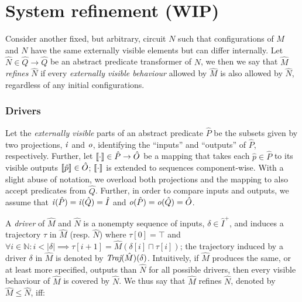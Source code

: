 \section{System refinement (WIP)}

Consider another fixed, but arbitrary, circuit $N$ such that configurations of $M$ and $N$ have the same externally visible elements but can differ internally. Let $\hat N \in \hat Q \rightarrow \hat Q$ be an abstract predicate transformer of $N$, we then we say that $\hat M$ \textit{refines} $\hat N$ if every \textit{externally visible behaviour} allowed by $\hat M$ is also allowed by $\hat N$, regardless of any initial configurations.


\subsubsection{Drivers} Let the \textit{externally visible} parts of an abstract predicate $\hat P$ be the subsets given by two projections, $\mathit{i}$ and $\mathit{o}$, identifying the ``inputs'' and ``outputs'' of $\hat P$, respectively. Further, let $\llbracket\cdot\rrbracket \in \hat P \rightarrow \hat O$ be a mapping that takes each $\hat p \in \hat P$ to its visible outputs $\llbracket\hat p\rrbracket \in \hat O$; $\llbracket\cdot\rrbracket$ is extended to sequences component-wise. With a slight abuse of notation, we overload both projections and the mapping to also accept predicates from $\hat Q$. Further, in order to compare inputs and outputs, we assume that $\mathit{i}(\hat P) = \mathit{i}(\hat Q) = \hat I$ and $\mathit{o}(\hat P) = \mathit{o}(\hat Q) = \hat O$.

A \textit{driver} of $\hat M$ and $\hat N$ is a nonempty sequence of inputs, $\delta \in \hat I^{+}$, and induces a trajectory $\tau$ in $\hat M$ (resp. $\hat N$) where $\tau[0] = \top$ and $\forall i \in \mathbb{N} : i < | \delta | \implies \tau[i+1] = \hat M(\delta[i] \sqcap \tau[i])$; the trajectory induced by a driver $\delta$ in $\hat M$ is denoted by $\textit{Traj}(\hat M)(\delta)$. Intuitively, if $\hat M$ produces the same, or at least more specified, outputs than $\hat N$ for all possible drivers, then every visible behaviour of $\hat M$ is covered by $\hat N$. We thus say that $\hat M$ refines $\hat N$, denoted by $\hat M \leq \hat N$, iff:



